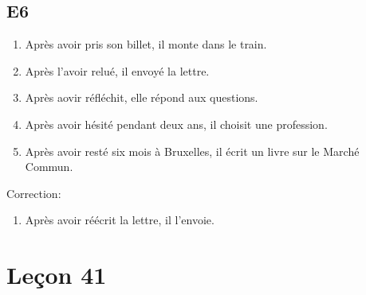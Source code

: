 \documentclass{book}
\begin{document}
    \section{E6}
        \begin{enumerate}
            \item Après avoir pris son billet, il monte dans le train.
            \item Après l'avoir relué, il envoyé la lettre.
            \item Après aovir réfléchit, elle répond aux questions.
            \item Après avoir hésité pendant deux ans, il choisit une profession.
            \item Après avoir resté six mois à Bruxelles, il écrit un livre sur le Marché Commun.
        \end{enumerate}
        Correction:
        \begin{enumerate}
            \item Après avoir réécrit la lettre, il l'envoie.
        \end{enumerate}

\chapter{Leçon 41}
    \section{}
\end{document}
